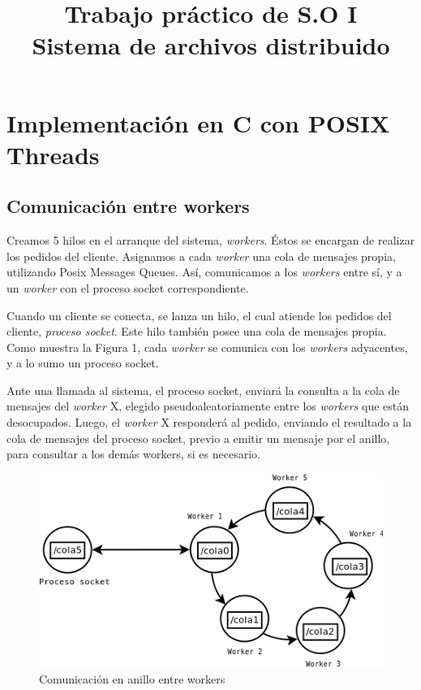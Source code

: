 \documentclass[a4paper, 8pt]{article}
\title{Trabajo práctico de S.O I \\ Sistema de archivos distribuido}
\begin{document}
\maketitle

\section{Implementación en C con POSIX Threads}

\subsection{Comunicación entre workers}

Creamos 5 hilos en el arranque del sistema, \textit{workers}. Éstos se encargan de realizar los pedidos del cliente.
Asignamos a cada \textit{worker} una cola de mensajes propia, utilizando Posix Messages Queues. Así, comunicamos a los \textit{workers} entre sí,
y a un \textit{worker} con el proceso socket correspondiente.

Cuando un cliente se conecta, se lanza un hilo, el cual atiende los pedidos del cliente, \textit{proceso socket}.
Este hilo también posee una cola de mensajes propia.
Como muestra la Figura 1, cada \textit{worker} se comunica con los \textit{workers} adyacentes, y a lo sumo un proceso socket.

Ante una llamada al sistema, el proceso socket, enviará la consulta a la cola de mensajes del \textit{worker} X, elegido pseudoaleatoriamente
entre los \textit{workers} que están desocupados.
Luego, el \textit{worker} X responderá al pedido, enviando el resultado a la cola de mensajes del proceso socket,
previo a emitir un mensaje por el anillo, para consultar a los demás workers, si es necesario.


 \begin{figure}[htbp]
   \centering
     \includegraphics[scale=0.75]{dia1.png}
     \caption{Comunicación en anillo entre workers}
   \label{Figura 1}
 \end{figure}
\end{document}
